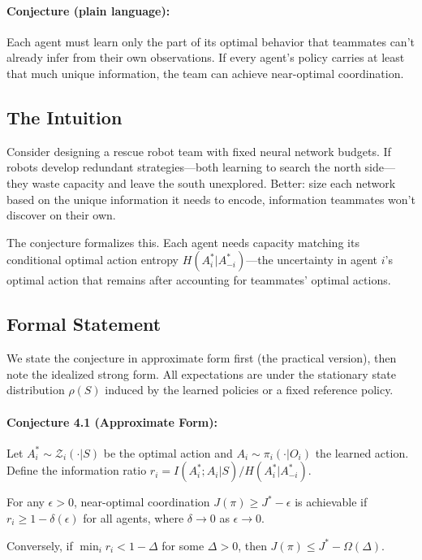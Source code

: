 \documentclass[10pt, letterpaper]{article}
\begin{document}
\paragraph{Conjecture (plain language):} Each agent must learn only the part of its optimal behavior that teammates can't already infer from their own observations. If every agent's policy carries at least that much unique information, the team can achieve near-optimal coordination.

\subsection{The Intuition}

Consider designing a rescue robot team with fixed neural network budgets. If robots develop redundant strategies---both learning to search the north side---they waste capacity and leave the south unexplored. Better: size each network based on the unique information it needs to encode, information teammates won't discover on their own.

The conjecture formalizes this. Each agent needs capacity matching its conditional optimal action entropy $H(A_i^*|A_{-i}^*)$---the uncertainty in agent $i$'s optimal action that remains after accounting for teammates' optimal actions.

\subsection{Formal Statement}

We state the conjecture in approximate form first (the practical version), then note the idealized strong form. All expectations are under the stationary state distribution $\rho(S)$ induced by the learned policies or a fixed reference policy.

\paragraph{Conjecture 4.1 (Approximate Form):} Let $A_i^* \sim \mathcal{Z}_i(\cdot|S)$ be the optimal action and $A_i \sim \pi_i(\cdot|O_i)$ the learned action. Define the information ratio $r_i = I(A_i^*; A_i | S) / H(A_i^* | A_{-i}^*)$.

For any $\epsilon > 0$, near-optimal coordination $J(\pi) \geq J^* - \epsilon$ is achievable if $r_i \geq 1 - \delta(\epsilon)$ for all agents, where $\delta \to 0$ as $\epsilon \to 0$.

Conversely, if $\min_i r_i < 1 - \Delta$ for some $\Delta > 0$, then $J(\pi) \leq J^* - \Omega(\Delta)$.
\end{document}
